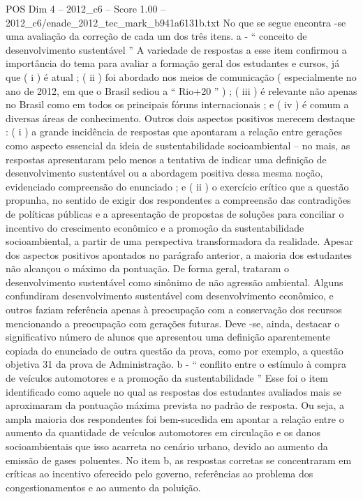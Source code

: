 \begin{textsample}{POS Dim 4 – 2012\_c6 – Score 1.00 – 2012\_c6/enade\_2012\_tec\_mark\_b941a6131b.txt}
No que se segue encontra -se uma avaliação da correção de cada um dos três itens. a - “ conceito de desenvolvimento sustentável ” A variedade de respostas a esse item confirmou a importância do tema para avaliar a formação geral dos estudantes e cursos, já que ( i ) é atual ; ( ii ) foi abordado nos meios de comunicação ( especialmente no ano de 2012, em que o Brasil sediou a “ Rio+20 ” ) ; ( iii ) é relevante não apenas no Brasil como em todos os principais fóruns internacionais ; e ( iv ) é comum a diversas áreas de conhecimento.
Outros dois aspectos positivos merecem destaque : ( i ) a grande incidência de respostas que apontaram a relação entre gerações como aspecto essencial da ideia de sustentabilidade socioambiental – no mais, as respostas apresentaram pelo menos a tentativa de indicar uma definição de desenvolvimento sustentável ou a abordagem positiva dessa mesma noção, evidenciado compreensão do enunciado ; e ( ii ) o exercício crítico que a questão propunha, no sentido de exigir dos respondentes a compreensão das contradições de políticas públicas e a apresentação de propostas de soluções para conciliar o incentivo do crescimento econômico e a promoção da sustentabilidade socioambiental, a partir de uma perspectiva transformadora da realidade.
Apesar dos aspectos positivos apontados no parágrafo anterior, a maioria dos estudantes não alcançou o máximo da pontuação.
De forma geral, trataram o desenvolvimento sustentável como sinônimo de não agressão ambiental.
Alguns confundiram desenvolvimento sustentável com desenvolvimento econômico, e outros faziam referência apenas à preocupação com a conservação dos recursos mencionando a preocupação com gerações futuras.
Deve -se, ainda, destacar o significativo número de alunos que apresentou uma definição aparentemente copiada do enunciado de outra questão da prova, como por exemplo, a questão objetiva 31 da prova de Administração. b - “ conflito entre o estímulo à compra de veículos automotores e a promoção da sustentabilidade ” Esse foi o item identificado como aquele no qual as respostas dos estudantes avaliados mais se aproximaram da pontuação máxima prevista no padrão de resposta.
Ou seja, a ampla maioria dos respondentes foi bem-sucedida em apontar a relação entre o aumento da quantidade de veículos automotores em circulação e os danos socioambientais que isso acarreta no cenário urbano, devido ao aumento da emissão de gases poluentes.
No item b, as respostas corretas se concentraram em críticas ao incentivo oferecido pelo governo, referências ao problema dos congestionamentos e ao aumento da poluição.

\end{textsample}
